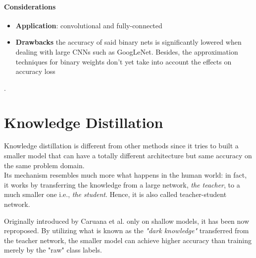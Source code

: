 \paragraph{Considerations}
\begin{itemize}
    \item \textbf{Application}: convolutional and fully-connected 
    
    \item \textbf{Drawbacks} the accuracy of said binary nets is significantly lowered when dealing with large CNNs such as GoogLeNet. Besides, the approximation techniques for binary weights don't yet take into account the effects on accuracy loss
\end{itemize}
. 


\newpage
\section{Knowledge Distillation}
Knowledge distillation is different from other methods since it tries to built a smaller model that can have a totally different architecture but same accuracy on the same problem domain. 
\\
Its mechanism resembles much more what happens in the human world: in fact, it works by transferring the knowledge from a large network, \emph{the teacher}, to a much smaller one i.e., \emph{the student}. Hence, it is also called teacher-student network. 

Originally introduced by Caruana et al. \parencite{caruana} only on shallow models, it has been now reproposed. By utilizing what is known as the \emph{"dark knowledge"} transferred from the teacher network, the smaller model can achieve higher accuracy than training merely by the "raw" class labels.

